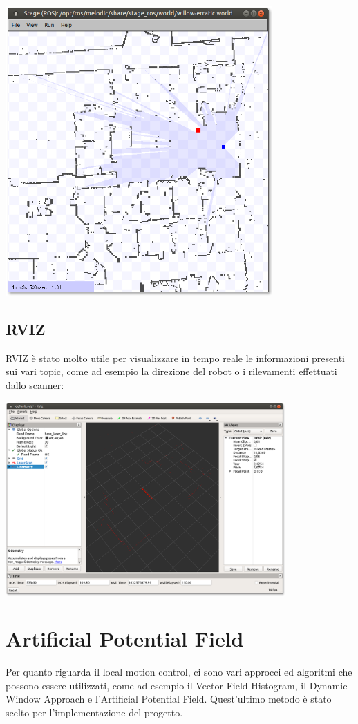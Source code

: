 \documentclass[Lau, binding=0.6cm, oneside]{sapthesis}
\begin{document}
\vspace{1em}
\includegraphics[height=30em]{stage_ros.png}

\subsection{RVIZ}
RVIZ è stato molto utile per visualizzare in tempo reale le informazioni presenti sui vari topic, come ad esempio la direzione del robot o i rilevamenti effettuati dallo scanner:

\vspace{1em}
\includegraphics[height=20em]{rviz.png}

\section{Artificial Potential Field}
Per quanto riguarda il local motion control, ci sono vari approcci ed algoritmi che possono essere utilizzati, come ad esempio il Vector Field Histogram, il Dynamic Window Approach e l'Artificial Potential Field.
Quest'ultimo metodo è stato scelto per l'implementazione del progetto.
\end{document}
